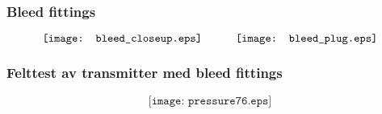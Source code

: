 \documentclass[aspectratio=169,xcolor=dvipsnames]{beamer}
\begin{document}
%
\begin{frame}
	\frametitle{Bleed fittings}

$$\texttt{[image: bleed\_closeup.eps]} \hskip 30pt \texttt{[image: bleed\_plug.eps]}$$
\end{frame}

%
%
%
%
%
%
\begin{frame}
	\frametitle{Felttest av transmitter med bleed fittings}

	$$\texttt{[image: pressure76.eps]}$$
\end{frame}
\end{document}
